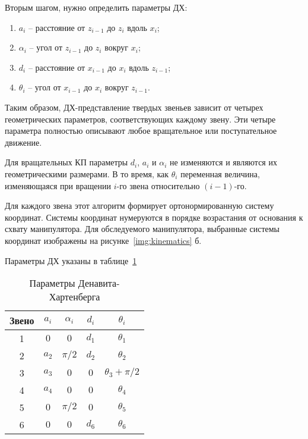 Вторым шагом, нужно определить параметры ДХ:

\begin{enumerate}
	\item $a_i$ -- расстояние от $z_{i-1}$ до $z_i$ вдоль $x_i$;
	\item $\alpha_i$ -- угол от $z_{i-1}$ до $z_i$ вокруг $x_i$;
	\item $d_i$ -- расстояние от $x_{i-1}$ до $x_i$ вдоль $z_{i-1}$;
	\item $\theta_i$ -- угол от $x_{i-1}$ до $x_i$ вокруг $z_{i-1}$.
\end{enumerate}

Таким образом, ДХ-представление твердых звеньев зависит от четырех геометрических параметров, соответствующих каждому звену. Эти четыре параметра полностью описывают любое вращательное или поступательное движение. 

Для вращательных КП параметры $d_i$, $a_i$ и $\alpha_i$ не изменяются и являются их геометрическими размерами. В то время,  как $\theta_i$ переменная величина, изменяющаяся при вращении $i$-го звена относительно $(i-1)$-го.

Для каждого звена этот алгоритм формирует ортонормированную систему координат. Системы координат нумеруются в порядке возрастания от основания к схвату манипулятора. Для обследуемого манипулятора, выбранные системы координат изображены на рисунке~\ref{img:kinematics} б. 

Параметры ДХ указаны в таблице~\ref{table_DH_params}

\begin{table}[h!]
	\caption{Параметры Денавита-Хартенберга}
	\begin{center}
		\begin{tabular}{|c|c|c|c|c|}
			\hline
			Звено 	& $a_i$ & $\alpha_i$ & $d_i$ & $\theta_i$\\
			\hline
			1 		& $0$ & $0$ 	& $d_1$ & $\theta_1$\\
			\hline
			2  		& $a_2$ & $\pi/2$ & $d_2$ & $\theta_2$\\
			\hline	
			3 		& $a_3$ & $0$ 	& $0$ 	& $\theta_3+\pi/2$\\
			\hline
			4 		& $a_4$ & $0$ 	& $0$ 	& $\theta_4$\\
			\hline
			5 		& $0$ & $\pi/2$ & $0$ 	& $\theta_5$\\
			\hline
			6 		& $0$ & $0$ 	& $d_6$ & $\theta_6$\\
			\hline
		\end{tabular}
	\end{center}
	\label{table_DH_params}
\end{table}

